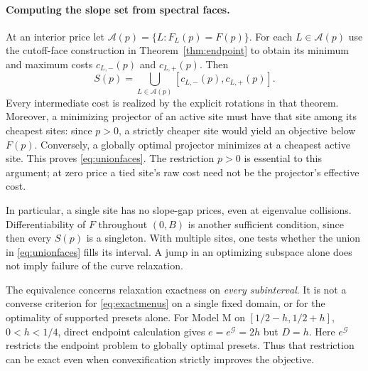 \paragraph{Computing the slope set from spectral faces.}
At an interior price let $\mathcal A(p)=\{L:F_L(p)=F(p)\}$.
For each $L\in\mathcal A(p)$ use the cutoff-face construction in
Theorem~\ref{thm:endpoint} to obtain its minimum and maximum costs
$c_{L,-}(p)$ and $c_{L,+}(p)$. Then
\begin{equation}\label{eq:unionfaces}
 S(p)=\bigcup_{L\in\mathcal A(p)}
 [c_{L,-}(p),c_{L,+}(p)].
\end{equation}
Every intermediate cost is realized by the explicit rotations in that
theorem. Moreover, a minimizing projector of an active site must have
that site among its cheapest sites: since $p>0$, a strictly cheaper site
would yield an objective below $F(p)$. Conversely, a globally optimal
projector minimizes at a cheapest active site. This proves
\eqref{eq:unionfaces}. The restriction $p>0$ is essential to this
argument; at zero price a tied site's raw cost need not be the
projector's effective cost.

In particular, a single site has no slope-gap prices, even at eigenvalue
collisions. Differentiability of $F$ throughout $(0,B)$ is another
sufficient condition, since then every $S(p)$ is a singleton. With
multiple sites, one tests whether the union in \eqref{eq:unionfaces}
fills its interval. A jump in an optimizing subspace alone does not
imply failure of the curve relaxation.

\begin{remark}
The equivalence concerns relaxation exactness on \emph{every subinterval}.
It is not a converse criterion for \eqref{eq:exactmenus} on a single
fixed domain, or for the optimality of supported presets alone. For
Model M on $[1/2-h,1/2+h]$, $0<h<1/4$, direct endpoint calculation
gives $e=e^{\mathcal G}=2h$ but $D=h$. Here $e^{\mathcal G}$ restricts
the endpoint problem to globally optimal presets. Thus that restriction
can be exact even when convexification strictly improves the objective.
\end{remark}

